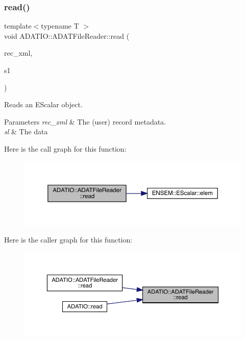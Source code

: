 \subsubsection{\texorpdfstring{read()}{read()}\hspace{0.1cm}{\footnotesize\ttfamily [1/7]}}
{\footnotesize\ttfamily template$<$typename T $>$ \\
void A\+D\+A\+T\+I\+O\+::\+A\+D\+A\+T\+File\+Reader\+::read (\begin{DoxyParamCaption}\item[{\mbox{\hyperlink{classADATXML_1_1XMLReader}{X\+M\+L\+Reader}} \&}]{rec\+\_\+xml,  }\item[{\mbox{\hyperlink{classENSEM_1_1EScalar}{E\+Scalar}}$<$ T $>$ \&}]{s1 }\end{DoxyParamCaption})}



Reads an E\+Scalar object. 


\begin{DoxyParams}{Parameters}
{\em rec\+\_\+xml} & The (user) record metadata. \\
\hline
{\em sl} & The data \\
\hline
\end{DoxyParams}
Here is the call graph for this function\+:\nopagebreak
\begin{figure}[H]
\begin{center}
\leavevmode
\includegraphics[width=350pt]{db/de5/group__qio_gac92ce1b0fee7c00b8a7dc988f3d4906e_cgraph}
\end{center}
\end{figure}
Here is the caller graph for this function\+:\nopagebreak
\begin{figure}[H]
\begin{center}
\leavevmode
\includegraphics[width=350pt]{db/de5/group__qio_gac92ce1b0fee7c00b8a7dc988f3d4906e_icgraph}
\end{center}
\end{figure}
\mbox{\label{group__qio_ga32969d6bfdfe9da2912e92d1f0871c20}} 
